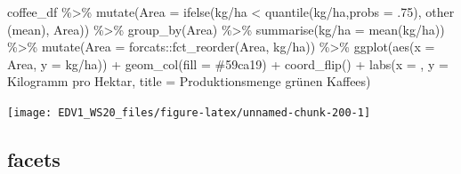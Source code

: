 \documentclass[
]{book}
\newenvironment{Shaded}{\begin{snugshade}}{\end{snugshade}}
\newcommand{\AttributeTok}[1]{\textcolor[rgb]{0.77,0.63,0.00}{#1}}
\newcommand{\DecValTok}[1]{\textcolor[rgb]{0.00,0.00,0.81}{#1}}
\newcommand{\FunctionTok}[1]{\textcolor[rgb]{0.00,0.00,0.00}{#1}}
\newcommand{\NormalTok}[1]{#1}
\newcommand{\OtherTok}[1]{\textcolor[rgb]{0.56,0.35,0.01}{#1}}
\newcommand{\SpecialCharTok}[1]{\textcolor[rgb]{0.00,0.00,0.00}{#1}}
\newcommand{\StringTok}[1]{\textcolor[rgb]{0.31,0.60,0.02}{#1}}
\begin{document}
\begin{Shaded}
\begin{Highlighting}[]
\NormalTok{coffee\_df }\SpecialCharTok{\%\textgreater{}\%} 
  \FunctionTok{mutate}\NormalTok{(}\AttributeTok{Area =} \FunctionTok{ifelse}\NormalTok{(}\StringTok{\textasciigrave{}}\AttributeTok{kg/ha}\StringTok{\textasciigrave{}} \SpecialCharTok{\textless{}} \FunctionTok{quantile}\NormalTok{(}\StringTok{\textasciigrave{}}\AttributeTok{kg/ha}\StringTok{\textasciigrave{}}\NormalTok{,}\AttributeTok{probs =}\NormalTok{ .}\DecValTok{75}\NormalTok{),}
                       \StringTok{\textquotesingle{}other (mean)\textquotesingle{}}\NormalTok{,}
\NormalTok{                       Area)) }\SpecialCharTok{\%\textgreater{}\%} 
  \FunctionTok{group\_by}\NormalTok{(Area) }\SpecialCharTok{\%\textgreater{}\%} 
  \FunctionTok{summarise}\NormalTok{(}\StringTok{\textasciigrave{}}\AttributeTok{kg/ha}\StringTok{\textasciigrave{}} \OtherTok{=} \FunctionTok{mean}\NormalTok{(}\StringTok{\textasciigrave{}}\AttributeTok{kg/ha}\StringTok{\textasciigrave{}}\NormalTok{)) }\SpecialCharTok{\%\textgreater{}\%} 
  \FunctionTok{mutate}\NormalTok{(}\AttributeTok{Area =}\NormalTok{ forcats}\SpecialCharTok{::}\FunctionTok{fct\_reorder}\NormalTok{(Area, }\StringTok{\textasciigrave{}}\AttributeTok{kg/ha}\StringTok{\textasciigrave{}}\NormalTok{)) }\SpecialCharTok{\%\textgreater{}\%} 
  \FunctionTok{ggplot}\NormalTok{(}\FunctionTok{aes}\NormalTok{(}\AttributeTok{x =}\NormalTok{ Area,}
             \AttributeTok{y =} \StringTok{\textasciigrave{}}\AttributeTok{kg/ha}\StringTok{\textasciigrave{}}\NormalTok{)) }\SpecialCharTok{+}
  \FunctionTok{geom\_col}\NormalTok{(}\AttributeTok{fill =} \StringTok{\textquotesingle{}\#59ca19\textquotesingle{}}\NormalTok{) }\SpecialCharTok{+}
  \FunctionTok{coord\_flip}\NormalTok{() }\SpecialCharTok{+}
  \FunctionTok{labs}\NormalTok{(}\AttributeTok{x =} \StringTok{\textquotesingle{}\textquotesingle{}}\NormalTok{,}
       \AttributeTok{y =} \StringTok{\textquotesingle{}Kilogramm pro Hektar\textquotesingle{}}\NormalTok{,}
       \AttributeTok{title =} \StringTok{\textquotesingle{}Produktionsmenge grünen Kaffees\textquotesingle{}}\NormalTok{)}
\end{Highlighting}
\end{Shaded}

\begin{center}\texttt{[image: EDV1\_WS20\_files/figure-latex/unnamed-chunk-200-1]} \end{center}

\hypertarget{facets}{%
\subsection{facets}\label{facets}}
\end{document}
